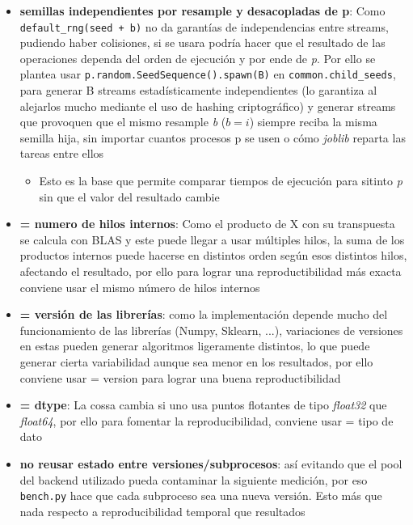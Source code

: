 \documentclass[11pt]{article}
\begin{document}
\begin{itemize}
  \item \textbf{semillas independientes por resample y desacopladas de p}: Como \texttt{default\_rng(seed + b)} no da garant\'ias de independencias entre streams, pudiendo haber colisiones, si se usara podr\'ia hacer que el resultado de las operaciones dependa del orden de ejecuci\'on y por ende de \textit{p}. Por ello se plantea usar \texttt{p.random.SeedSequence().spawn(B)} en \texttt{common.child\_seeds}, para generar B streams estad\'isticamente independientes (lo garantiza al alejarlos mucho mediante el uso de hashing criptogr\'afico) y generar streams que provoquen que el mismo resample \textit{b} ($b=i$) siempre reciba la misma semilla hija, sin importar cuantos procesos p se usen o c\'omo \textit{joblib} reparta las tareas entre ellos
  \begin{itemize}
    \item Esto es la base que permite comparar tiempos de ejecuci\'on para sitinto \textit{p} sin que el valor del resultado cambie
  \end{itemize}
  \item \textbf{= numero de hilos internos}: Como el producto de X con su transpuesta se calcula con BLAS y este puede llegar a usar m\'ultiples hilos, la suma de los productos internos puede hacerse en distintos orden seg\'un esos distintos hilos, afectando el resultado, por ello para lograr una reproductibilidad m\'as exacta conviene usar el mismo n\'umero de hilos internos
  \item \textbf{= versi\'on de las librer\'ias}: como la implementaci\'on depende mucho del funcionamiento de las librer\'ias (Numpy, Sklearn, ...), variaciones de versiones en estas pueden generar algoritmos ligeramente distintos, lo que puede generar cierta variabilidad aunque sea menor en los resultados, por ello conviene usar = version para lograr una buena reproductibilidad
  \item \textbf{= dtype}: La cossa cambia si uno usa puntos flotantes de tipo \textit{float32} que \textit{float64}, por ello para fomentar la reproducibilidad, conviene usar = tipo de dato
  \item \textbf{no reusar estado entre versiones/subprocesos}: as\'i evitando que el pool del backend utilizado pueda contaminar la siguiente medici\'on, por eso \texttt{bench.py} hace que cada subproceso sea una nueva versi\'on. Esto m\'as que nada respecto a reproducibilidad temporal que resultados
\end{itemize}
\end{document}
